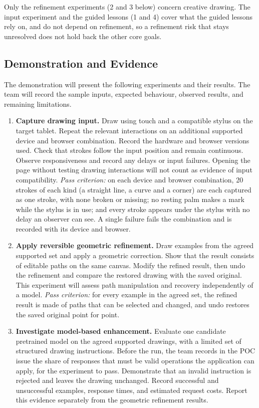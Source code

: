 \documentclass{article}
\begin{document}
Only the refinement experiments (2 and 3 below) concern creative
drawing. The input experiment and the guided lessons (1 and 4) cover
what the guided lessons rely on, and do not depend on
refinement, so a refinement risk that stays unresolved does not hold
back the other core goals.

\subsection{Demonstration and Evidence}

The demonstration will present the following experiments and their
results. The team will record the sample inputs, expected behaviour,
observed results, and remaining limitations.

\begin{enumerate}
    \item \textbf{Capture drawing input.}
    Draw using touch and a compatible stylus on the target tablet.
    Repeat the relevant interactions on an additional supported
    device and browser combination. Record the hardware and browser
    versions used. Check that strokes follow the input position
    and remain continuous. Observe
    responsiveness and record any delays or input failures.
    Opening the page without testing drawing interactions will not
    count as evidence of input compatibility.
    \emph{Pass criterion:} on each device and browser combination, 20
    strokes of each kind (a straight line, a curve and a corner) are each
    captured as one stroke, with none broken or missing; no resting palm
    makes a mark while the stylus is in use; and every stroke appears under
    the stylus with no delay an observer can see. A single failure fails the
    combination and is recorded with its device and browser.

    \item \textbf{Apply reversible geometric refinement.}
    Draw examples from the agreed supported set and apply a
    geometric correction. Show that the result consists of editable
    paths on the same canvas. Modify the refined result, then undo
    the refinement and compare the restored drawing with the saved
    original. This experiment will assess path manipulation and
    recovery independently of a model.
    \emph{Pass criterion:} for every example in the agreed set, the refined
    result is made of paths that can be selected and changed, and undo
    restores the saved original point for point.

    \item \textbf{Investigate model-based enhancement.}
    Evaluate one candidate pretrained model on the agreed supported
    drawings, with a limited set of structured drawing instructions. Before
    the run, the team records in the POC issue the share of responses that
    must be valid operations the application can apply, for the experiment
    to pass. Demonstrate that an invalid instruction is rejected and leaves
    the drawing unchanged. Record successful and unsuccessful examples,
    response times, and estimated request costs. Report this evidence
    separately from the geometric refinement results.


\end{enumerate}
\end{document}
